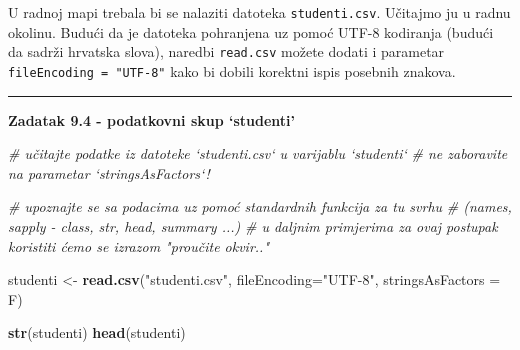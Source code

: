 \documentclass[]{book}
\newenvironment{Shaded}{\begin{snugshade}}{\end{snugshade}}
\newcommand{\KeywordTok}[1]{\textcolor[rgb]{0.13,0.29,0.53}{\textbf{#1}}}
\newcommand{\DataTypeTok}[1]{\textcolor[rgb]{0.13,0.29,0.53}{#1}}
\newcommand{\StringTok}[1]{\textcolor[rgb]{0.31,0.60,0.02}{#1}}
\newcommand{\CommentTok}[1]{\textcolor[rgb]{0.56,0.35,0.01}{\textit{#1}}}
\newcommand{\NormalTok}[1]{#1}
\theoremstyle{definition}
\theoremstyle{definition}
\theoremstyle{definition}
\theoremstyle{remark}
\begin{document}
U radnoj mapi trebala bi se nalaziti datoteka \texttt{studenti.csv}.
Učitajmo ju u radnu okolinu. Budući da je datoteka pohranjena uz pomoć
UTF-8 kodiranja (budući da sadrži hrvatska slova), naredbi
\texttt{read.csv} možete dodati i parametar
\texttt{fileEncoding\ =\ "UTF-8"} kako bi dobili korektni ispis posebnih
znakova.

\begin{center}\rule{0.5\linewidth}{\linethickness}\end{center}

\textbf{Zadatak 9.4 - podatkovni skup `studenti'}

\begin{Shaded}
\begin{Highlighting}[]
\CommentTok{# učitajte podatke iz datoteke `studenti.csv` u varijablu `studenti`}
\CommentTok{# ne zaboravite na parametar `stringsAsFactors`!}

\CommentTok{# upoznajte se sa podacima uz pomoć standardnih funkcija za tu svrhu}
\CommentTok{# (names, sapply - class, str, head, summary ...)}
\CommentTok{# u daljnim primjerima za ovaj postupak koristiti ćemo se izrazom "proučite okvir.."}
\end{Highlighting}
\end{Shaded}

\begin{Shaded}
\begin{Highlighting}[]
\NormalTok{studenti <-}\StringTok{ }\KeywordTok{read.csv}\NormalTok{(}\StringTok{"studenti.csv"}\NormalTok{, }\DataTypeTok{fileEncoding=}\StringTok{"UTF-8"}\NormalTok{, }\DataTypeTok{stringsAsFactors =}\NormalTok{ F)}

\KeywordTok{str}\NormalTok{(studenti)}
\KeywordTok{head}\NormalTok{(studenti)}
\end{Highlighting}
\end{Shaded}
\end{document}
